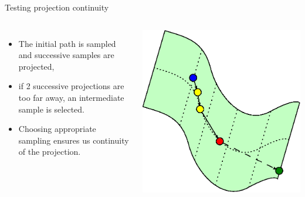 \begin {frame} {Testing projection continuity}
  \begin{columns}
    \centering
    \begin {itemize}
      \item The initial path is sampled and successive samples are projected,
      \item {if 2 successive projections are too far away, an intermediate sample is selected.}
      \item {\color {white} Choosing appropriate sampling ensures us continuity of the projection.}
    \end {itemize}
    \begin {center}
      \includegraphics [width=.9\linewidth] {figures/progressive_3.eps}
    \end {center}
  \end {columns}
\end {frame}

%
%

